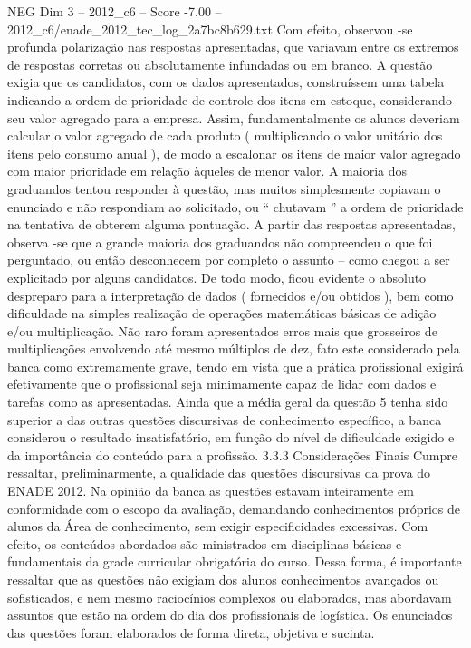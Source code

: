 \begin{textsample}{NEG Dim 3 – 2012\_c6 – Score -7.00 – 2012\_c6/enade\_2012\_tec\_log\_2a7bc8b629.txt}
Com efeito, observou -se profunda polarização nas respostas apresentadas, que variavam entre os extremos de respostas corretas ou absolutamente infundadas ou em branco.
A questão exigia que os candidatos, com os dados apresentados, construíssem uma tabela indicando a ordem de prioridade de controle dos itens em estoque, considerando seu valor agregado para a empresa.
Assim, fundamentalmente os alunos deveriam calcular o valor agregado de cada produto ( multiplicando o valor unitário dos itens pelo consumo anual ), de modo a escalonar os itens de maior valor agregado com maior prioridade em relação àqueles de menor valor.
A maioria dos graduandos tentou responder à questão, mas muitos simplesmente copiavam o enunciado e não respondiam ao solicitado, ou “ chutavam ” a ordem de prioridade na tentativa de obterem alguma pontuação.
A partir das respostas apresentadas, observa -se que a grande maioria dos graduandos não compreendeu o que foi perguntado, ou então desconhecem por completo o assunto – como chegou a ser explicitado por alguns candidatos.
De todo modo, ficou evidente o absoluto despreparo para a interpretação de dados ( fornecidos e/ou obtidos ), bem como dificuldade na simples realização de operações matemáticas básicas de adição e/ou multiplicação.
Não raro foram apresentados erros mais que grosseiros de multiplicações envolvendo até mesmo múltiplos de dez, fato este considerado pela banca como extremamente grave, tendo em vista que a prática profissional exigirá efetivamente que o profissional seja minimamente capaz de lidar com dados e tarefas como as apresentadas.
Ainda que a média geral da questão 5 tenha sido superior a das outras questões discursivas de conhecimento específico, a banca considerou o resultado insatisfatório, em função do nível de dificuldade exigido e da importância do conteúdo para a profissão. 3.3.3 Considerações Finais Cumpre ressaltar, preliminarmente, a qualidade das questões discursivas da prova do ENADE 2012.
Na opinião da banca as questões estavam inteiramente em conformidade com o escopo da avaliação, demandando conhecimentos próprios de alunos da Área de conhecimento, sem exigir especificidades excessivas.
Com efeito, os conteúdos abordados são ministrados em disciplinas básicas e fundamentais da grade curricular obrigatória do curso.
Dessa forma, é importante ressaltar que as questões não exigiam dos alunos conhecimentos avançados ou sofisticados, e nem mesmo raciocínios complexos ou elaborados, mas abordavam assuntos que estão na ordem do dia dos profissionais de logística.
Os enunciados das questões foram elaborados de forma direta, objetiva e sucinta.

\end{textsample}

